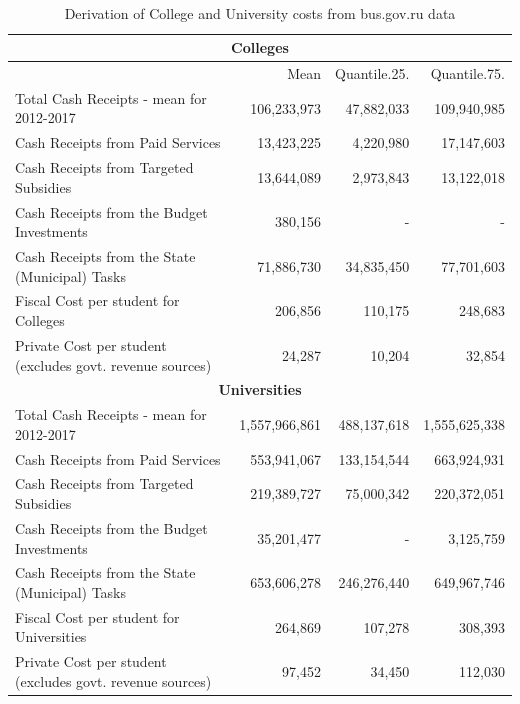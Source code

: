 \documentclass[alpha-refs]{wiley-article-05g}
\begin{document}
\begin{table}[htbp!]
    \centering
		\caption{Derivation of College and University costs from bus.gov.ru data}
		\label{tab:1.2}\\
    \begin{tabular}{|p{6cm}|r|r|r|}
    \hline
       \multicolumn{4}{|c|}{\textbf{Colleges}} \\ \hline
       & Mean & Quantile.25. & Quantile.75. \\ \hline
        Total Cash Receipts - mean for 2012-2017 & 106,233,973 & 47,882,033 & 109,940,985 \\ \hline
        Cash Receipts from Paid Services  & 13,423,225 & 4,220,980 & 17,147,603 \\ \hline
        Cash Receipts from Targeted Subsidies  & 13,644,089 & 2,973,843 & 13,122,018 \\ \hline
        Cash Receipts from the Budget Investments  & 380,156 & -  & - \\ \hline
        Cash Receipts from the State (Municipal) Tasks  & 71,886,730 & 34,835,450 & 77,701,603 \\ \hline
        Fiscal Cost per student for Colleges & 206,856 & 110,175 & 248,683 \\ \hline
        Private Cost per student (excludes govt. revenue sources)  & 24,287 & 10,204 & 32,854 \\ \hline
       \multicolumn{4}{|c|}{\textbf{Universities}} \\ \hline
           Total Cash Receipts - mean for 2012-2017 & 1,557,966,861 & 488,137,618 & 1,555,625,338 \\ \hline
        Cash Receipts from Paid Services & 553,941,067 & 133,154,544 & 663,924,931 \\ \hline
        Cash Receipts from Targeted Subsidies  & 219,389,727 & 75,000,342 & 220,372,051 \\ \hline
        Cash Receipts from the Budget Investments  & 35,201,477 & - & 3,125,759 \\ \hline
        Cash Receipts from the State (Municipal) Tasks  & 653,606,278 & 246,276,440 & 649,967,746 \\ \hline
        Fiscal Cost per student for Universities & 264,869 & 107,278 & 308,393 \\ \hline
        Private Cost per student (excludes govt. revenue sources) & 97,452 & 34,450 & 112,030 \\ \hline
    \end{tabular}
\end{table}
\end{document}
